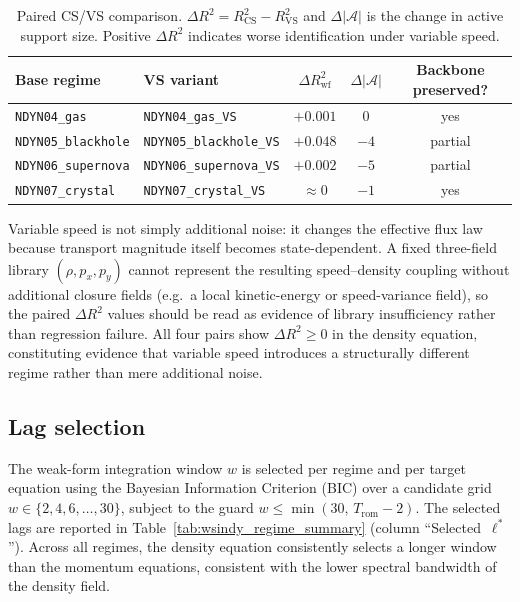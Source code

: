 \begin{table}[ht]
\centering
\caption{Paired CS/VS comparison.  $\Delta R^2 = R^2_{\text{CS}} - R^2_{\text{VS}}$
and $\Delta|\mathcal{A}|$ is the change in active support size.  Positive
$\Delta R^2$ indicates worse identification under variable speed.}
\label{tab:cs_vs_paired}
\renewcommand{\arraystretch}{0.95}
\small
\begin{tabular}{llccc}
\toprule
\textbf{Base regime} & \textbf{VS variant} & $\Delta R^2_{\text{wf}}$ & $\Delta|\mathcal{A}|$ & Backbone preserved? \\
\midrule
\texttt{NDYN04\_gas} & \texttt{NDYN04\_gas\_VS} & $+0.001$ & $0$ & yes \\
\texttt{NDYN05\_blackhole} & \texttt{NDYN05\_blackhole\_VS} & $+0.048$ & $-4$ & partial \\
\texttt{NDYN06\_supernova} & \texttt{NDYN06\_supernova\_VS} & $+0.002$ & $-5$ & partial \\
\texttt{NDYN07\_crystal} & \texttt{NDYN07\_crystal\_VS} & $\approx 0$ & $-1$ & yes \\
\bottomrule
\end{tabular}
\end{table}

Variable speed is not simply additional noise: it changes the effective
flux law because transport magnitude itself becomes state-dependent.
A fixed three-field library $(\rho, p_x, p_y)$ cannot represent the
resulting speed--density coupling without additional closure fields
(e.g.\ a local kinetic-energy or speed-variance field), so the paired
$\Delta R^2$ values should be read as evidence of library insufficiency
rather than regression failure.  All four pairs show $\Delta R^2 \geq 0$
in the density equation, constituting evidence that variable speed
introduces a structurally different regime rather than mere additional
noise.

\subsection{Lag selection}
\label{sec:wsindy_lag_selection}

The weak-form integration window $w$ is selected per regime and per
target equation using the Bayesian Information Criterion (BIC) over a
candidate grid $w\in\{2,4,6,\ldots,30\}$, subject to the guard
$w \leq \min(30,\, T_{\mathrm{rom}}-2)$.
The selected lags are reported in Table~\ref{tab:wsindy_regime_summary}
(column ``Selected~$\boldsymbol{\ell}^*$'').  Across all regimes,
the density equation consistently selects a longer window than the
momentum equations, consistent with the lower spectral bandwidth of the
density field.

